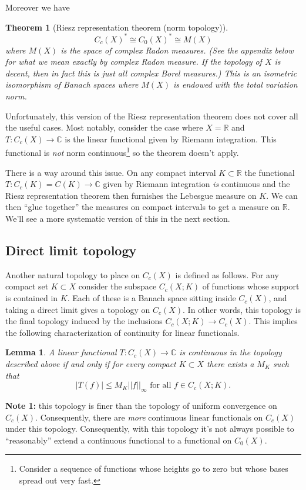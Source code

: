 \documentclass[a4paper,11pt,twoside]{amsart}
\newcommand{\C}{\mathbb{C}}
\newcommand{\R}{\mathbb{R}}
\newtheorem*{theorem}{Theorem}
\newtheorem*{lemma}{Lemma}
\theoremstyle{definition}
\begin{document}
Moreover we have
\begin{theorem}[Riesz representation theorem (norm topology)]
\[
C_c(X)^* \cong C_0(X)^* \cong M(X)
\]
where $M(X)$ is the space of complex Radon measures. (See the appendix below for what we mean exactly by complex Radon measure. If the topology of $X$ is decent, then in fact this is just all complex Borel measures.) This is an isometric isomorphism of Banach spaces where $M(X)$ is endowed with the total variation norm.
\end{theorem}

Unfortunately, this version of the Riesz representation theorem does not cover all the useful cases. Most notably, consider the case where $X=\R$ and $T\colon C_c(X) \to \C$ is the linear functional given by Riemann integration. This functional is \emph{not} norm continuous\footnote{Consider a sequence of functions whose heights go to zero but whose bases spread out very fast.} so the theorem doesn't apply.

There is a way around this issue. On any compact interval $K \subset \R$ the functional $T \colon C_c(K)=C(K) \to \C$ given by Riemann integration \emph{is} continuous and the Riesz representation theorem then furnishes the Lebesgue measure on $K$. We can then ``glue together'' the measures on compact intervals to get a measure on $\R.$ We'll see a more systematic version of this in the next section.

\subsection{Direct limit topology}
Another natural topology to place on $C_c(X)$ is defined as follows. For any compact set $K \subset X$ consider the subspace $C_c(X;K)$ of functions whose support is contained in $K$. Each of these is a Banach space sitting inside $C_c(X)$, and taking a direct limit gives a topology on $C_c(X)$. In other words, this topology is the final topology induced by the inclusions $C_c(X;K) \to C_c(X)$. This implies the following characterization of continuity for linear functionals.

\begin{lemma}
A linear functional $T \colon C_c(X) \to \C$ is continuous in the topology described above if and only if for every compact $K \subset X$ there exists a $M_K$ such that
\[
|T(f)| \leq M_K ||f||_\infty \text{ for all }f\in C_c(X;K).
\]
\end{lemma}

\textbf{Note 1:} this topology is finer than the topology of uniform convergence on $C_c(X)$. Consequently, there are \emph{more} continuous linear functionals on $C_c(X)$ under this topology. Consequently, with this topology it's not always possible to ``reasonably'' extend a continuous functional to a functional on $C_0(X)$.
\end{document}
